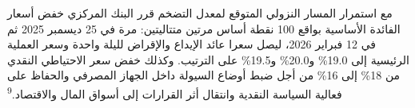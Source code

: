 مع استمرار المسار النزولي المتوقع لمعدل التضخم قرر البنك المركزي خفض أسعار الفائدة الأساسية بواقع 100 نقطة أساس مرتين متتاليتين: مرة في 25 ديسمبر 2025 ثم في 12 فبراير 2026، ليصل سعرا عائد الإيداع والإقراض لليلة واحدة وسعر العملية الرئيسية إلى 19.0\% و20.0\% و19.5\% على الترتيب. وكذلك خفض سعر الاحتياطي النقدي من 18\% إلى 16\% من أجل ضبط أوضاع السيولة داخل الجهاز المصرفي والحفاظ على فعالية السياسة النقدية وانتقال أثر القرارات إلى أسواق المال والاقتصاد.\textsuperscript{9}
